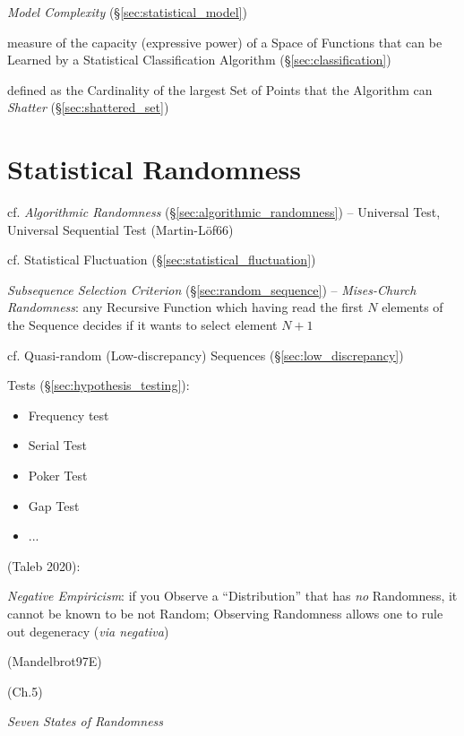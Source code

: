 \emph{Model Complexity} (\S\ref{sec:statistical_model})

measure of the capacity (expressive power) of a Space of Functions that can be
Learned by a Statistical Classification Algorithm (\S\ref{sec:classification})

defined as the Cardinality of the largest Set of Points that the Algorithm can
\emph{Shatter} (\S\ref{sec:shattered_set})



\section{Statistical Randomness}\label{sec:statistical_randomness}

cf. \emph{Algorithmic Randomness} (\S\ref{sec:algorithmic_randomness}) --
Universal Test, Universal Sequential Test (Martin-L\"of66)

cf. Statistical Fluctuation (\S\ref{sec:statistical_fluctuation})

\emph{Subsequence Selection Criterion} (\S\ref{sec:random_sequence}) --
\emph{Mises-Church Randomness}: any Recursive Function which having read the
first $N$ elements of the Sequence decides if it wants to select element $N+1$

cf. Quasi-random (Low-discrepancy) Sequences (\S\ref{sec:low_discrepancy})

Tests (\S\ref{sec:hypothesis_testing}):
\begin{itemize}
  \item Frequency test
  \item Serial Test
  \item Poker Test
  \item Gap Test
  \item ...
\end{itemize}

(Taleb 2020):

\emph{Negative Empiricism}: if you Observe a ``Distribution'' that has \emph{no}
Randomness, it cannot be known to be not Random; Observing Randomness allows one
to rule out degeneracy (\emph{via negativa})

(Mandelbrot97E)

(Ch.5)

\emph{Seven States of Randomness}

